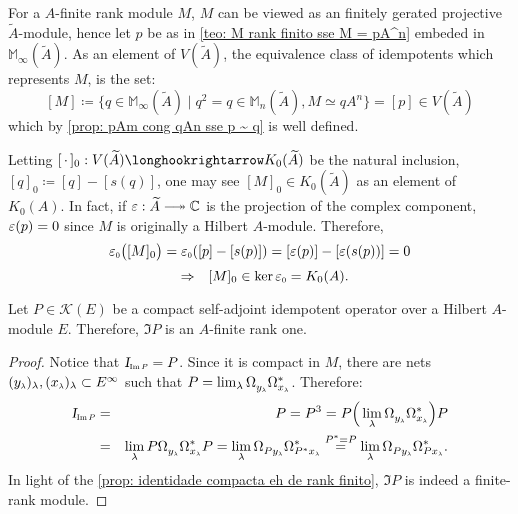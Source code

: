For a $A$-finite rank module $M$, $M$ can be viewed as an finitely gerated projective $\widetilde A$-module, hence let $p$ be as in \ref{teo: M rank finito sse M = pA^n} embeded in $\mathbb M_{\infty}({\widetilde{A}})$. As an element of $V({\widetilde{A}})$, the equivalence class of idempotents which represents $M$, is the set:
\[
[M] \coloneqq  \{q \in \mathbb M_\infty({\widetilde{A}}) \mid q^2 = q \in \mathbb M_{n}({\widetilde{A}}), M \simeq q A^n\} = [p] \in V({\widetilde{A}})
\]
which by \ref{prop: pAm cong qAn sse p ~ q} is well defined.

Letting $[\,\cdot\,]_0 : V({\widetilde{A}}) \longhookrightarrow K_0({\widetilde{A}})$ be the natural inclusion, $[q]_0 \coloneqq [q]- [s(q)]$, one may see $[M]_0 \in K_0({\widetilde{A}})$ as an element of $K_0(A)$. In fact, if $\ep : \widetilde A \longtwoheadrightarrow \C$ is the projection of the complex component, $\operatorname{{\varepsilon}}(p) = 0$ since $M$ is originally a Hilbert $A$-module. Therefore,
\[
\sub\ep0\big([M]_0\big) = \sub\ep0([p] - [s(p)]) = [\ep(p)]- [\ep(s(p))] = 0 
\]
\[
\To [M]_0 \in \ker \sub\ep0 = K_0(A).
\]

\begin{proposicao}
\label{prop: compacto idempotente eh rank finito}
Let $P \in \mathscr K(E)$ be a compact self-adjoint idempotent operator over a Hilbert $A$-module $E$. Therefore, $\Im P$ is an $A$-finite rank one.
\begin{proof}
Notice that $\sub{\Id}{\Im P} = P$. Since it is compact in $M$, there are nets $(\sub y\lambda)_\lambda, (\sub x\lambda)_\lambda \subset E^{\infty}$ such that $P = \lim_\lambda \Omega_{\sub y\lambda}^{\vphantom{*}}\Omega_{\sub x\lambda}^*$. Therefore:
\begin{eqnarray*}
\sub{\Id}{\Im P} &=& P = P^3 = P\Big(\lim_\lambda \Omega_{\sub y\lambda}^{\vphantom{*}}\Omega_{\sub x\lambda}^*\Big)P\\
&=& \lim_\lambda P\Omega_{\sub y\lambda}^{\vphantom{*}}\Omega_{\sub x\lambda}^*P =  \lim_\lambda \Omega_{P\sub y\lambda}^{\vphantom{*}}\Omega_{P^*\sub x\lambda}^*
\overset{P^*=P}= \lim_\lambda \Omega_{P\sub y\lambda}^{\vphantom{*}}\Omega_{P\sub x\lambda}^*.
\end{eqnarray*}
In light of the \ref{prop: identidade compacta eh de rank finito}, ${\Im P}$ is indeed a finite-rank module.
\end{proof}
\end{proposicao}

